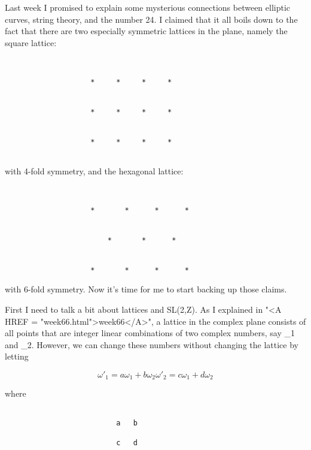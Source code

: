 

Last week I promised to explain some mysterious connections between
elliptic curves, string theory, and the number 24.  I claimed that
it all boils down to the fact that there are two especially symmetric
lattices in the plane, namely the square lattice:



\begin{verbatim}


                    *     *     *     *


                    *     *     *     *


                    *     *     *     *
         
\end{verbatim}
    
with 4-fold symmetry, and the hexagonal lattice:



\begin{verbatim}


                    *       *      *      *


                        *       *      *                


                    *       *      *      *

\end{verbatim}
    

with 6-fold symmetry.  Now it's time for me to start backing up those
claims.  

First I need to talk a bit about lattices and SL(2,Z).  As I explained
in "<A HREF = "week66.html">week66</A>", a lattice in the complex plane consists of all points that
are integer linear combinations of two complex numbers, 
say \omega _{1} and
\omega _{2}.  However, we can change these numbers without 
changing the lattice by letting


$$

                 \omega '_{1} = a \omega _{1} + b \omega _{2}

                 \omega '_{2} = c \omega _{1} + d \omega _{2}

$$
    
where 

\begin{verbatim}

                          a   b 

                          c   d
\end{verbatim}
    
